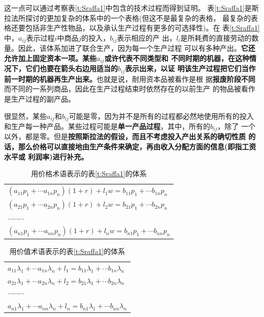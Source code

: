 这一点可以通过考察表\ref{t:Sraffa1}中包含的技术过程而得到证明。
表\ref{t:Sraffa1}是斯拉法所探讨的更加复杂的体系中的一个表格(但这不是最复杂的表格，
最复杂的表格还要包括非生产性物品，以及承认生产过程有更多的可选择性)。在
表\ref{t:Sraffa1}中，$a_{ij}$表示过程$i$中商品$j$的投入，$b_{ij}$表示相应的产
出，$l_i$是所耗费的直接劳动的数量。因此，该体系加进了联合生产，因为每一个生产过程
可以有多种产出。\textbf{它还允许加上固定资本一项。某些$a_{ij}$或许代表不同类型和
  不同时期的机器，在这种情况下，它们也要在箭头右边用适当的$b_{ij}$表示出来，以证
  明该生产过程把它们当作前一时期的机器再生产出来。}也就是说，耐用资本品被看作是根
据\textbf{报废阶段不同}而不同的一系列商品，因此在生产过程结束时依然存在的以前生产
的物品被看作是生产过程的副产品。

很显然，某些$a_{ij}和b_{ij}$可能是零，因为并不是所有的过程都必然地使用所有的投入
和生产每一种产品。某些过程可能是\textbf{单一产品过程}，其中，所有的$b_{ij}$，除了
一个以外，都是零。但是\textbf{按照斯拉法的假设，而且不考虑投入产出关系的确切性质
  的话，那么价格可以直接地由生产条件来确定，再由收入分配方面的信息(即指工资水平或
  利润率)进行补充。}

\begin{table}[htbp]
\centering
\caption{用价格术语表示的表\ref{t:Sraffa1}的体系}
\label{t:Sraffa2}
\begin{tabular}{l}
  $\displaystyle (a_{11}p_1+ \cdots a_{1n}p_{n})(1+r)+l_{1}w=b_{11}p_{1}+ \cdots b_{1n}p_{n} $\\
  $\displaystyle (a_{21}p_{1}+ \cdots a_{2n}p_{n})(1+r)+l_{2}w=b_{21}p_{1}+ \cdots b_{2n}p_{n}$\\
  $\displaystyle \cdots \cdots \cdots$\\
  $\displaystyle (a_{n1}p_{1}+ \cdots a_{nn}p_{n})(1+r)+l_{n}w=b_{n1}p_{1}+ \cdots b_{nn}p_{n}$
\end{tabular}
\end{table}

\begin{table}[htbp]
\centering
\caption{用价值术语表示的表\ref{t:Sraffa1}的体系}
\label{t:Sraffa3}
\begin{tabular}{l}
  $\displaystyle a_{11} \lambda _1+ \cdots a_{1n} \lambda _n+l_1=b_{11} \lambda _1+ \cdots b_{1n} \lambda _n$\\
  $\displaystyle a_{21} \lambda _1+ \cdots a_{2n} \lambda _n+l_2=b_{21} \lambda _1+ \cdots b_{2n} \lambda _n$\\
  $\displaystyle \cdots \cdots \cdots$ \\
  $\displaystyle a_{n1} \lambda _1+ \cdots a_{nn} \lambda _n+l_n=b_{n1} \lambda _1+ \cdots b_{nn} \lambda _n$\\
\end{tabular}
\end{table}

